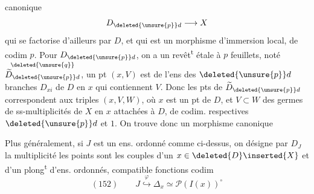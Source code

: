 canonique
\[
D_{\deleted{\unsure{p}}d}\longrightarrow X
\]
qui se factorise d'ailleurs par $D$, et qui est un morphisme d'immersion local, de codim $p$. Pour $D_{\deleted{\unsure{p}}d}$, on a un revêt\textsuperscript{t} étale à $p$ feuillets, noté $\overset{\deleted{\unsure{q}}}{\widetilde D_{\deleted{\unsure{p}}d}}$,  un pt $(x,V)$ est  de l'ens des $\deleted{\unsure{p}}d$ branches $D_{xi}$ de $D$ en $x$ qui contiennent $V$. Donc les  pts de $\widetilde D_{\deleted{\unsure{p}}d}$ correspondent aux triples $(x,V,W)$, où $x$ est un pt de $D$, et $V\subset W$ des germes de ss-multiplicités de $X$ en $x$ attachées à $D$, de codim. respectives $\deleted{\unsure{p}}d$ et $1$. On trouve donc un morphisme canonique

Plus généralement, si $J$ est un ens.  ordonné comme ci-dessus,  on  désigne par $D_J$ la  multiplicité  les points sont les couples d'un $x\in\deleted{D}\inserted{X}$  et d'un plong\textsuperscript{t} d'ens. ordonnés, compatible  fonctions codim
\[
(152)\qquad J\mathrel{\overset{\varphi}{\hookrightarrow}}\Delta_x\simeq\mathcal P(I(x))^\circ
\]
